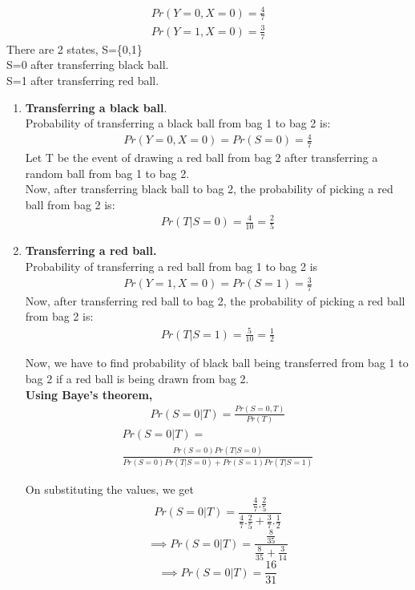 \documentclass[journal,12pt,twocolumn]{IEEEtran}
\begin{document}
\begin{align}
    Pr(Y=0,X=0)=\frac{4}{7}\\
    Pr(Y=1,X=0)=\frac{3}{7}
\end{align}
There are 2 states,
S=\{0,1\}\\
S=0 after transferring black ball.\\
S=1 after transferring red ball.\\
\begin{enumerate}
    \item \textbf{Transferring a black ball}.\\
    
Probability of transferring a black ball from bag 1 to bag 2 is:
\begin{align}
    Pr(Y=0,X=0)=Pr(S=0)=\frac{4}{7}
\end{align}
Let T be the event of drawing a red ball from bag 2 after transferring a random ball from bag 1 to bag 2.\\
Now, after transferring black ball to bag 2, the probability of picking a red ball from bag 2 is:
\begin{align}
    Pr(T|S=0)=\frac{4}{10}=\frac{2}{5}
\end{align}

\item \textbf{Transferring a red ball.}\\

Probability of transferring a red ball from bag 1 to bag 2 is
\begin{align}
    Pr(Y=1,X=0)=Pr(S=1)=\frac{3}{7}
\end{align}
Now, after transferring red ball to bag 2, the probability of picking a red ball from bag 2 is:
\begin{align}
    Pr(T|S=1)=\frac{5}{10}=\frac{1}{2}
\end{align}

Now, we have to find probability of black ball being transferred from bag 1 to bag 2 if a red ball is being drawn from bag 2.\\

\textbf{Using Baye's theorem,}
\begin{align}
    Pr(S=0|T)=\frac{Pr(S=0,T)}{Pr(T)}
\end{align}
\begin{multline*}
    Pr(S=0|T)=\\
    \frac{Pr(S=0)Pr(T|S=0)}{Pr(S=0)Pr(T|S=0)+Pr(S=1)Pr(T|S=1)}
\end{multline*}

On substituting the values, we get
\[Pr(S=0|T)=\frac{\frac{4}{7}.\frac{2}{5}}{\frac{4}{7}.\frac{2}{5}+\frac{3}{7}.\frac{1}{2}}\]
\[\implies Pr(S=0|T)  =\frac{\frac{8}{35}}{\frac{8}{35}+\frac{3}{14}}\]
\[\implies  Pr(S=0|T)=\frac{16}{31}\]

\end{enumerate}
\end{document}
